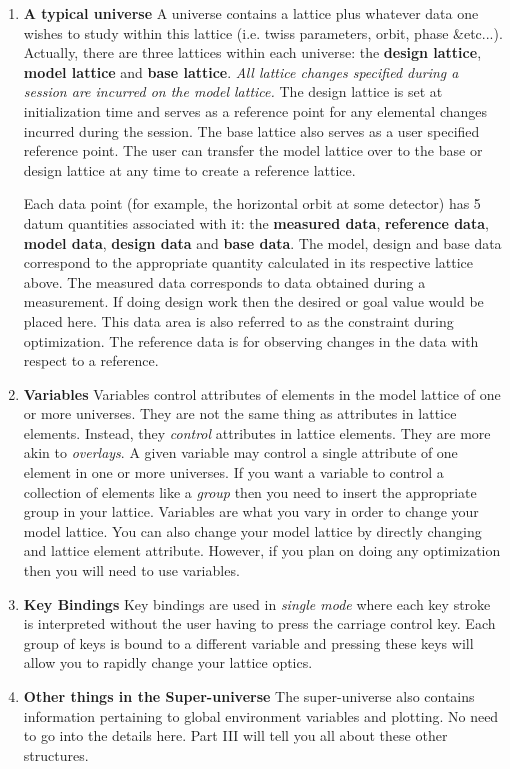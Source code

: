 \begin{enumerate}

\item \textbf{A typical universe}
\Newline A universe contains a \bmad lattice plus whatever data one
wishes to study within this lattice (i.e. twiss parameters, orbit,
phase \&etc...). Actually, there are three lattices within each
universe: the \textbf{design lattice}, \textbf{model lattice} and
\textbf{base lattice}. \emph{All lattice changes specified during a
\tao session are incurred on the model lattice.} The design lattice is
set at initialization time and serves as a reference point for any
elemental changes incurred during the \tao session. The base lattice
also serves as a user specified reference point. The user can transfer
the model lattice over to the base or design lattice at any time to
create a reference lattice.

Each data point (for example, the horizontal orbit at some detector)
has 5 datum quantities associated with it: the \textbf{measured data},
\textbf{reference data}, \textbf{model data}, \textbf{design data} and
\textbf{base data}. The model, design and base data correspond to the
appropriate quantity calculated in its respective lattice above. The
measured data corresponds to data obtained during a measurement. If
doing design work then the desired or goal value would be placed
here. This data area is also referred to as the constraint during
optimization. The reference data is for observing changes in the data
with respect to a reference.

\item \textbf{Variables} \Newline
Variables control attributes of elements in the model lattice of one
or more universes. They are not the same thing as attributes in
lattice elements.  Instead, they \textit{control} attributes in
lattice elements. They are more akin to \bmad \textit{overlays}. A
given variable may control a single attribute of one element in one or
more universes. If you want a variable to control a collection of
elements like a \bmad \textit{group} then you need to insert the
appropriate group in your lattice. Variables are what you vary in
order to change your model lattice. You can also change your model
lattice by directly changing and lattice element attribute. However,
if you plan on doing any optimization then you will need to use
variables.

\item \textbf{Key Bindings} \Newline
Key bindings are used in \textit{single mode} where each key stroke is
interpreted without the user having to press the carriage control key.
Each group of keys is bound to a different variable and pressing these
keys will allow you to rapidly change your lattice optics.

\item \textbf{Other things in the Super-universe} \Newline
The super-universe also contains information pertaining to global
environment variables and plotting. No need to go into the details
here. Part III will tell you all about these other structures.
\end{enumerate}


